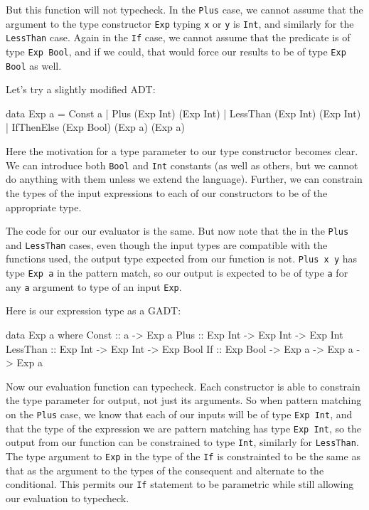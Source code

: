 But this function will not typecheck. In the {\tt Plus} case, we cannot
assume that the argument to the type constructor {\tt Exp} typing {\tt x} or {\tt y}
is {\tt Int}, and similarly for the {\tt LessThan} case. Again in the {\tt If}
case, we cannot assume that the predicate is of type {\tt Exp Bool}, and if we
could, that would force our results to be of type {\tt Exp Bool} as well.

Let's try a slightly modified ADT:

\begin{code}
data Exp a = Const a
           | Plus (Exp Int) (Exp Int)
           | LessThan (Exp Int) (Exp Int)
           | IfThenElse (Exp Bool) (Exp a) (Exp a)
\end{code}

Here the motivation for a type parameter to our type constructor becomes clear.
We can introduce both {\tt Bool} and {\tt Int} constants (as well as others, but
we cannot do anything with them unless we extend the language). Further, we
can constrain the types of the input expressions to each of our constructors to
be of the appropriate type.

The code for our our evaluator is the same. But now note that the in the
{\tt Plus} and {\tt LessThan} cases, even though the input types are compatible
with the functions used, the output type expected from our function is not.
{\tt Plus x y} has type {\tt Exp a} in the pattern match, so our output is
expected to be of type {\tt a} for any {\tt a} argument to type of an 
input {\tt Exp}.

Here is our expression type as a GADT:
\begin{code}
data Exp a where
  Const    :: a                               -> Exp a
  Plus     :: Exp Int  -> Exp Int             -> Exp Int
  LessThan :: Exp Int  -> Exp Int             -> Exp Bool
  If       :: Exp Bool -> Exp a   -> Exp a    -> Exp a
\end{code}

Now our evaluation function can typecheck. Each constructor is able to constrain
the type parameter for output, not just its arguments. So when pattern matching
on the {\tt Plus} case, we know that each of our inputs will be of type
{\tt Exp Int}, and that the type of the expression we are pattern matching has
type {\tt Exp Int}, so the output from our function can be constrained to type
{\tt Int}, similarly for {\tt LessThan}. The type argument to {\tt Exp} in the
type of the {\tt If} is constrainted to be the same as that as the argument
to the types of the consequent and alternate to the conditional. This permits
our {\tt If} statement to be parametric while still allowing our evaluation to
typecheck.

